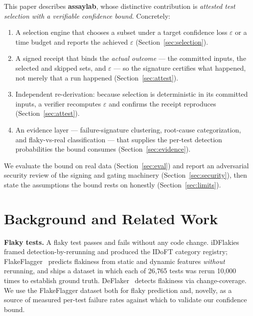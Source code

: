 \documentclass[11pt]{article}
\newcommand{\eps}{\varepsilon}
\begin{document}
This paper describes \textbf{assaylab}, whose distinctive contribution is
\emph{attested test selection with a verifiable confidence bound}. Concretely:

\begin{enumerate}[leftmargin=1.4em,itemsep=2pt]
  \item A selection engine that chooses a subset under a target confidence loss
        $\eps$ or a time budget and reports the achieved $\eps$
        (Section~\ref{sec:selection}).
  \item A signed receipt that binds the \emph{actual outcome} --- the committed
        inputs, the selected and skipped sets, and $\eps$ --- so the signature
        certifies what happened, not merely that a run happened
        (Section~\ref{sec:attest}).
  \item Independent re-derivation: because selection is deterministic in its
        committed inputs, a verifier recomputes $\eps$ and confirms the receipt
        reproduces (Section~\ref{sec:attest}).
  \item An evidence layer --- failure-signature clustering, root-cause
        categorization, and flaky-vs-real classification --- that supplies the
        per-test detection probabilities the bound consumes
        (Section~\ref{sec:evidence}).
\end{enumerate}

We evaluate the bound on real data (Section~\ref{sec:eval}) and report an
adversarial security review of the signing and gating machinery
(Section~\ref{sec:security}), then state the assumptions the bound rests on
honestly (Section~\ref{sec:limits}).

\section{Background and Related Work}

\textbf{Flaky tests.} A flaky test passes and fails without any code change.
iDFlakies~\cite{idflakies} framed detection-by-rerunning and produced the IDoFT
category registry; FlakeFlagger~\cite{flakeflagger} predicts flakiness from
static and dynamic features \emph{without} rerunning, and ships a dataset in
which each of 26{,}765 tests was rerun 10{,}000 times to establish ground truth.
DeFlaker~\cite{deflaker} detects flakiness via change-coverage. We use the
FlakeFlagger dataset both for flaky prediction and, novelly, as a source of
measured per-test failure rates against which to validate our confidence bound.
\end{document}
